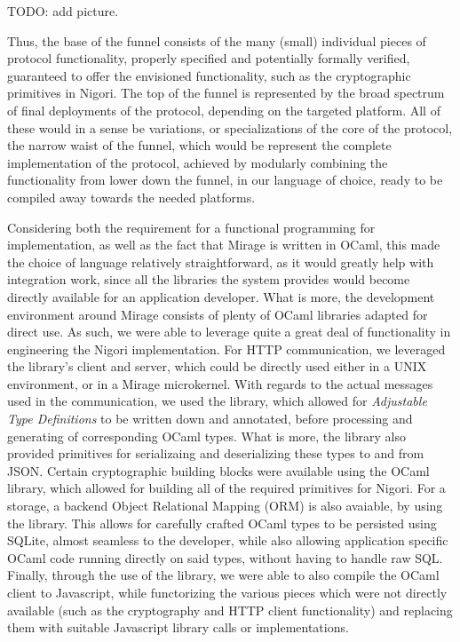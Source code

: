 TODO: add picture.

Thus, the base of the funnel consists of the many (small) individual pieces of protocol functionality, properly specified and potentially formally verified, guaranteed to offer the envisioned functionality, such as the cryptographic primitives in Nigori.
The top of the funnel is represented by the broad spectrum of final deployments of the protocol, depending on the targeted platform.
All of these would in a sense be variations, or specializations of the core of the protocol, the narrow waist of the funnel, which would be represent the complete implementation of the protocol, achieved by modularly combining the functionality from lower down the funnel, in our language of choice, ready to be compiled away towards the needed platforms.

Considering both the requirement for a functional programming for implementation, as well as the fact that Mirage is written in OCaml, this made the choice of language relatively straightforward, as it would greatly help with integration work, since all the libraries the system provides would become directly available for an application developer.
What is more, the development environment around Mirage consists of plenty of OCaml libraries adapted for direct use.
As such, we were able to leverage quite a great deal of functionality in engineering the Nigori implementation.
For HTTP communication, we leveraged the  library's client and server, which could be directly used either in a UNIX environment, or in a Mirage microkernel.
With regards to the actual messages used in the communication, we used the  library, which allowed for \textit{Adjustable Type Definitions} to be written down and annotated, before processing and generating of corresponding OCaml types.
What is more, the library also provided primitives for serializaing and deserializing these types to and from JSON.
Certain cryptographic building blocks were available using the OCaml  library, which allowed for building all of the required primitives for Nigori.
For a storage, a backend Object Relational Mapping (ORM) is also avaiable, by using the  library.
This allows for carefully crafted OCaml types to be persisted using SQLite, almost seamless to the developer, while also allowing application specific OCaml code running directly on said types, without having to handle raw SQL.
Finally, through the use of the  library, we were able to also compile the OCaml client to Javascript, while functorizing the various pieces which were not directly available (such as the cryptography and HTTP client functionality) and replacing them with suitable Javascript library calls or implementations.
